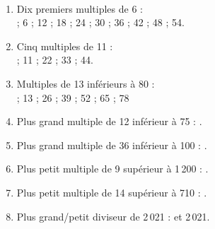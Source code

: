    \ \\ [-5mm]\begin{enumerate}
      \item Dix premiers multiples de 6 : \\
         { ; 6 ; 12 ; 18 ; 24 ; 30 ; 36 ; 42 ; 48 ; 54}.
      \item Cinq multiples de 11 : \\
         { ; 11 ; 22 ; 33 ; 44}.
      \item Multiples de 13 inférieurs à 80 : \\
         { ; 13 ; 26 ; 39 ; 52 ; 65 ; 78}
      \item Plus grand multiple de 12 inférieur à 75 : {}.
      \item Plus grand multiple de 36 inférieur à 100 : {}.
      \item Plus petit multiple de 9 supérieur à 1\,200 : {}.
      \item Plus petit multiple de 14 supérieur à 710 : {}.
      \item Plus grand/petit diviseur de 2\,021 : { et 2\,021}.
   \end{enumerate}
